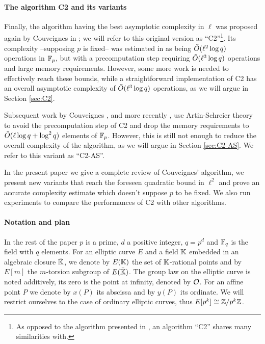 \paragraph{The algorithm C2 and its variants}
Finally, the algorithm having the best asymptotic complexity in $\ell$
was proposed again by Couveignes in \cite{Cou96}; we will refer to
this original version as ``C2''\footnote{As opposed to the algorithm
  presented in \cite{Cou94}, an algorithm ``C2'' shares many
  similarities with.}. Its complexity --supposing $p$ is fixed-- was
estimated in \cite{Cou96} as being $\tilde{O}(\ell^2\log q)$ operations
in $\mathbb{F}_p$, but with a precomputation step requiring $\tilde{O}(\ell^3\log
q)$ operations and large memory requirements. However, some more work
is needed to effectively reach these bounds, while a straightforward
implementation of C2 has an overall asymptotic complexity of
$\tilde{O}(\ell^3\log q)$ operations, as we will argue in Section
\ref{sec:C2}.

Subsequent work by Couveignes \cite{Cou00}, and more recently
\cite{DFS09}, use Artin-Schreier theory to avoid the precomputation
step of C2 and drop the memory requirements to $\tilde{O}(\ell\log q +
\log^2 q)$ elements of $\mathbb{F}_p$. However, this is still not enough to
reduce the overall complexity of the algorithm, as we will argue in
Section \ref{sec:C2-AS}. We refer to this variant as ``C2-AS''.

In the present paper we give a complete review of Couveignes'
algorithm, we present new variants that reach the foreseen quadratic
bound in $\ell^2$ and prove an accurate complexity estimate which
doesn't suppose $p$ to be fixed. We also run experiments to compare
the performances of C2 with other algorithms.

\paragraph{Notation and plan}
In the rest of the paper $p$ is a prime, $d$ a positive integer,
$q=p^d$ and $\mathbb{F}_q$ is the field with $q$ elements. For an elliptic
curve $E$ and a field $\mathbb{K}$ embedded in an algebraic closure
$\bar{\mathbb{K}}$, we denote by $E(\mathbb{K})$ the set of $\mathbb{K}$-rational points and
by $E[m]$ the $m$-torsion subgroup of $E(\bar{\mathbb{K}})$. The group law on
the elliptic curve is noted additively, its zero is the point at
infinity, denoted by $\mathcal{O}$. For an affine point $P$ we denote by $x(P)$
its abscissa and by $y(P)$ its ordinate. We will restrict ourselves to
the case of ordinary elliptic curves, thus $E[p^k]\cong\mathbb{Z}/p^k\mathbb{Z}$.

